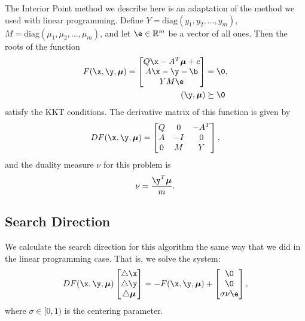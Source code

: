 The Interior Point method we describe here is an adaptation of the method we used with linear programming.
Define $Y = \text{diag}(y_1,y_2,\ldots,y_m)$, $M = \text{diag}(\mu_1,\mu_2,\ldots,\mu_m)$, and let $\e\in\mathbb{R}^m$ be a vector of all ones.
Then the roots of the function
\begin{align*}
F(\x,\y,\Mu) =
\begin{bmatrix}
Q\x-A^T\Mu + c\\
A\x-\y-\b\\
YM\e
\end{bmatrix}
&= \0,\\
(\y,\Mu) &\succeq \0
\end{align*}
satisfy the KKT conditions.
The derivative matrix of this function is given by
\[
DF(\x,\y,\Mu) =
\begin{bmatrix}
Q & 0 & -A^T\\
A & -I & 0\\
0 & M & Y
\end{bmatrix},
\]
and the duality measure $\nu$ for this problem is \[\nu = \frac{\y^T\Mu}{m}.\]

\subsection*{Search Direction}

We calculate the search direction for this algorithm the same way that we did in the linear programming case.
That is, we solve the system:
\begin{align}
DF(\x,\y,\Mu)
\begin{bmatrix}\triangle \x\\ \triangle \y\\ \triangle \Mu\end{bmatrix}
= - F(\x,\y,\Mu) +
\begin{bmatrix} \0 \\ \0 \\ \sigma\nu\e \end{bmatrix},
\label{eq:searchDirection}
\end{align}
where $\sigma\in [0,1)$ is the centering parameter.

